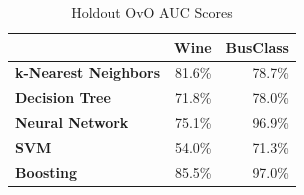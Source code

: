 \documentclass[
	letterpaper, %
]{jdf}
\begin{document}
\begin{table}
\centering
\caption{Holdout OvO AUC Scores}
\begin{tabular}{lrr}
\toprule
{} &  Wine &  BusClass \\
\midrule
\textbf{k-Nearest Neighbors} & 81.6\% &     78.7\% \\
\textbf{Decision Tree      } & 71.8\% &     78.0\% \\
\textbf{Neural Network     } & 75.1\% &     96.9\% \\
\textbf{SVM                } & 54.0\% &     71.3\% \\
\textbf{Boosting           } & 85.5\% &     97.0\% \\
\bottomrule
\end{tabular}
\end{table}
\end{document}
